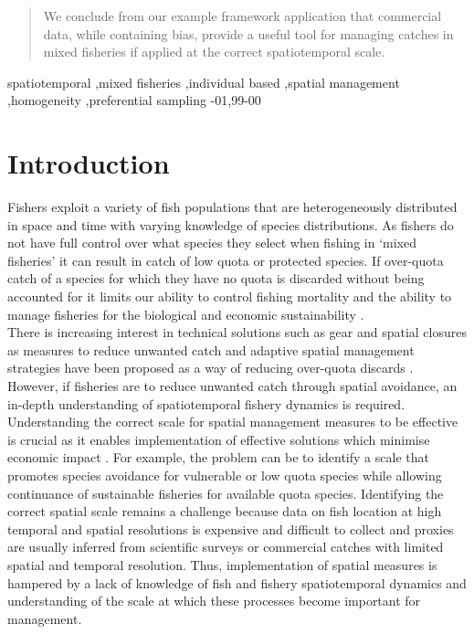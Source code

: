 \documentclass[review]{elsarticle}
\begin{document}
\begin{frontmatter}
\begin{abstract}
We conclude from our example framework application that commercial data, while
containing bias, provide a useful tool for managing catches in mixed fisheries
if applied at the correct spatiotemporal scale. \\
\end{abstract}

\begin{keyword}
spatiotemporal \sep mixed fisheries \sep individual based \sep spatial
management \sep homogeneity \sep  preferential sampling
-01\sep  99-00
\end{keyword}

\end{frontmatter}

\linenumbers

\section{Introduction}

Fishers exploit a variety of fish populations that are heterogeneously
distributed in space and time with varying knowledge of species distributions.
As fishers do not have full control over what species they select when fishing
in `mixed fisheries' it can result in catch of low quota or protected species.
If over-quota catch of a species for which they have no quota is discarded
without being accounted for it limits our ability to control fishing mortality
\citep{Alverson1994, Crowder1998, Rijnsdorp2007} and the ability to manage
fisheries for the biological and economic sustainability \citep{Ulrich2011a,
	Batsleer2015}.\\

There is increasing interest in technical solutions such as gear and spatial
closures as measures to reduce unwanted catch \citep{Kennelly2002,
	Catchpole2008, Bellido2011, Cosgrove2019} and adaptive spatial
management strategies have been proposed as a way of reducing over-quota
discards \citep{Holmes2011, Little2014, Dunn2014a}. However, if fisheries are
to reduce unwanted catch through spatial avoidance, an in-depth understanding
of spatiotemporal fishery dynamics is required. \\

Understanding the correct scale for spatial management measures to be effective
is crucial as it enables implementation of effective solutions which minimise
economic impact \citep{Dunn2016}. For example, the problem can be to identify a
scale that promotes species avoidance for vulnerable or low quota species while
allowing continuance of sustainable fisheries for available quota species.
Identifying the correct spatial scale remains a challenge because data on fish
location at high temporal and spatial resolutions is expensive and difficult to
collect and proxies are usually inferred from scientific surveys or commercial
catches with limited spatial and temporal resolution. Thus, implementation of
spatial measures is hampered by a lack of knowledge of fish and fishery
spatiotemporal dynamics and understanding of the scale at which these processes
become important for management. \\ \\ 
\end{document}
